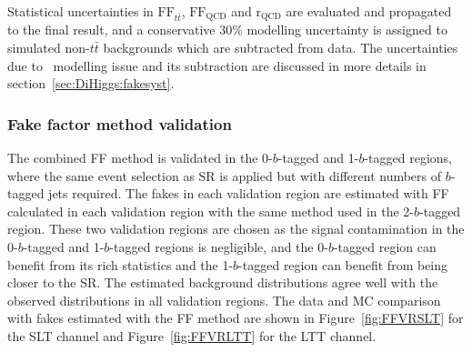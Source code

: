 Statistical uncertainties in $\text{FF}_{t\bar{t}}$, $\text{FF}_\text{QCD}$ and $\mathrm{r}_\text{QCD}$
are evaluated and propagated to the final result,
and a conservative 30\% modelling uncertainty is assigned to simulated non-$t\bar t$ backgrounds
which are subtracted from data.
The uncertainties due to \ttbar\ modelling issue and its subtraction are discussed in more details
in section~\ref{sec:DiHiggs:fakesyst}.

\newpage
\subsubsection{Fake factor method validation}
The combined FF method is validated in
the 0-$b$-tagged and 1-$b$-tagged regions, where the same event selection as SR 
is applied but with different numbers of $b$-tagged jets required. 
The fakes in each validation region are estimated with FF calculated in each validation region 
with the same method used in the 2-$b$-tagged region.
These two validation regions are chosen as 
the signal contamination in the 0-$b$-tagged 
and 1-$b$-tagged regions is negligible,
and the 0-$b$-tagged region can benefit from its rich statistics 
and the 1-$b$-tagged region can benefit from being closer to the SR.
The estimated background distributions agree well 
with the observed distributions in all validation regions.
The data and MC comparison with fakes estimated with the FF method 
are shown in Figure~\ref{fig:FFVRSLT} for the SLT channel and
Figure~\ref{fig:FFVRLTT} for the LTT channel. 

